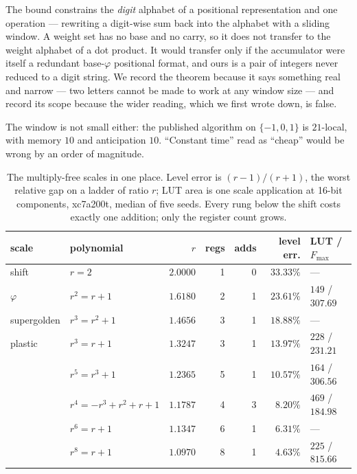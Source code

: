 The bound constrains the \emph{digit} alphabet of a positional representation
and one operation --- rewriting a digit-wise sum back into the alphabet with a
sliding window. A weight set has no base and no carry, so it does not transfer
to the weight alphabet of a dot product. It would transfer only if the
accumulator were itself a redundant base-$\varphi$ positional format, and ours
is a pair of integers never reduced to a digit string. We record the theorem
because it says something real and narrow --- two letters cannot be made to work
at any window size --- and record its scope because the wider reading, which we
first wrote down, is false.

The window is not small either: the published algorithm on $\{-1,0,1\}$ is
$21$-local, with memory $10$ and anticipation $10$. ``Constant time'' read as
``cheap'' would be wrong by an order of magnitude.

\begin{table}[t]\centering
\caption{The multiply-free scales in one place. Level error is $(r-1)/(r+1)$,
the worst relative gap on a ladder of ratio $r$; LUT area is one scale
application at 16-bit components, xc7a200t, median of five seeds. Every rung
below the shift costs exactly one addition; only the register count grows.}
\label{tab:allscales}
\begin{tabular}{llrrrrl}
\toprule
scale & polynomial & $r$ & regs & adds & level err. & LUT / $F_{\max}$ \\
\midrule
shift        & $r=2$              & $2.0000$ & 1 & 0 & $33.33\%$ & --- \\
$\varphi$    & $r^2=r+1$          & $1.6180$ & 2 & 1 & $23.61\%$ & $149$ / $307.69$ \\
supergolden  & $r^3=r^2+1$        & $1.4656$ & 3 & 1 & $18.88\%$ & --- \\
plastic      & $r^3=r+1$          & $1.3247$ & 3 & 1 & $13.97\%$ & $228$ / $231.21$ \\
             & $r^5=r^3+1$        & $1.2365$ & 5 & 1 & $10.57\%$ & $164$ / $306.56$ \\
             & $r^4{=}{-}r^3{+}r^2{+}r{+}1$ & $1.1787$ & 4 & 3 & $8.20\%$ & $469$ / $184.98$ \\
             & $r^6=r+1$          & $1.1347$ & 6 & 1 & $6.31\%$ & --- \\
             & $r^8=r+1$          & $1.0970$ & 8 & 1 & $4.63\%$ & $225$ / $815.66$ \\
\bottomrule
\end{tabular}
\end{table}

